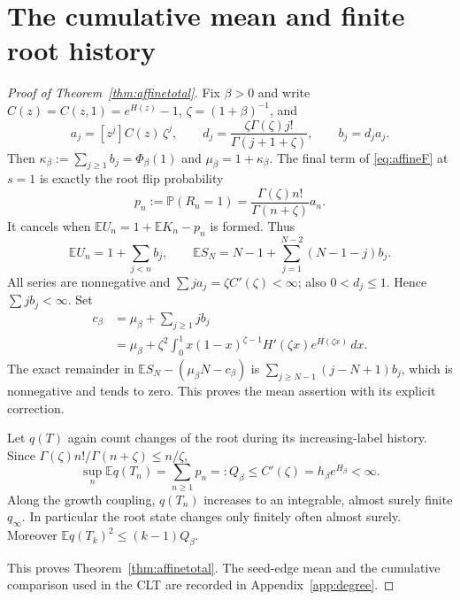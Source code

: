 \documentclass[runningheads,envcountsame,orivec]{llncs}
\newcommand{\E}{\mathbb E}
\newcommand{\PP}{\mathbb P}
\begin{document}
\section{The cumulative mean and finite root history}\label{app:affinetotal}

\begin{proof}[Proof of Theorem~\ref{thm:affinetotal}]
Fix $\beta>0$ and write $C(z)=C(z,1)=e^{H(z)}-1$,
$\zeta=(1+\beta)^{-1}$, and
\[
 a_j=[z^j]C(z)\,\zeta^j,\qquad
 d_j=\frac{\zeta\Gamma(\zeta)j!}{\Gamma(j+1+\zeta)},\qquad
 b_j=d_j a_j.
\]
Then $\kappa_\beta:=\sum_{j\ge1}b_j=\Phi_\beta(1)$ and
$\mu_\beta=1+\kappa_\beta$.
The final term of \eqref{eq:affineF} at $s=1$ is exactly the root
flip probability
\[
 p_n:=\PP(R_n=1)
 =\frac{\Gamma(\zeta)n!}{\Gamma(n+\zeta)}a_n.
\]
It cancels when $\E U_n=1+\E K_n-p_n$ is formed. Thus
\begin{equation}\label{eq:exactPAtotalmean}
 \E U_n=1+\sum_{j<n}b_j,\qquad
 \E S_N=N-1+\sum_{j=1}^{N-2}(N-1-j)b_j.
\end{equation}
All series are nonnegative and
$\sum j a_j=\zeta C'(\zeta)<\infty$;
also $0<d_j\le1$. Hence $\sum j b_j<\infty$. Set
\begin{equation}\label{eq:meancorrection}
 \begin{split}
 c_\beta&=\mu_\beta+\sum_{j\ge1}j b_j\\
 &=\mu_\beta+\zeta^2\int_0^1
 x(1-x)^{\zeta-1}H'(\zeta x)e^{H(\zeta x)}\,dx.
 \end{split}
\end{equation}
The exact remainder in
$\E S_N-(\mu_\beta N-c_\beta)$ is
$\sum_{j\ge N-1}(j-N+1)b_j$, which is nonnegative and tends to
zero. This proves the mean assertion with its explicit correction.

Let $q(T)$ again count changes of the root during its increasing-label
history. Since $\Gamma(\zeta)n!/\Gamma(n+\zeta)\le n/\zeta$,
\begin{equation}\label{eq:PArootfinite}
 \sup_n\E q(T_n)=\sum_{n\ge1}p_n
 =:Q_\beta\le C'(\zeta)=h_\beta e^{H_\beta}<\infty.
\end{equation}
Along the growth coupling, $q(T_n)$ increases to an integrable,
almost surely finite $q_\infty$. In particular the root state changes
only finitely often almost surely. Moreover
$\E q(T_k)^2\le(k-1)Q_\beta$.


This proves Theorem~\ref{thm:affinetotal}. The seed-edge mean and
the cumulative comparison used in the CLT are recorded in
Appendix~\ref{app:degree}.
\end{proof}
\end{document}
